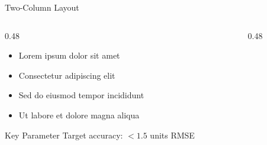 \begin{frame}{Two-Column Layout}
  \begin{columns}[T]
    \begin{column}{0.48\textwidth}
      \begin{itemize}
        \item Lorem ipsum dolor sit amet
        \item Consectetur adipiscing elit
        \item Sed do eiusmod tempor incididunt
        \item Ut labore et dolore magna aliqua
      \end{itemize}

      \vspace{0.5em}

      \begin{block}{Key Parameter}
        Target accuracy: $< 1.5$ units RMSE
      \end{block}
    \end{column}

    \begin{column}{0.48\textwidth}
    \end{column}
  \end{columns}
\end{frame}
